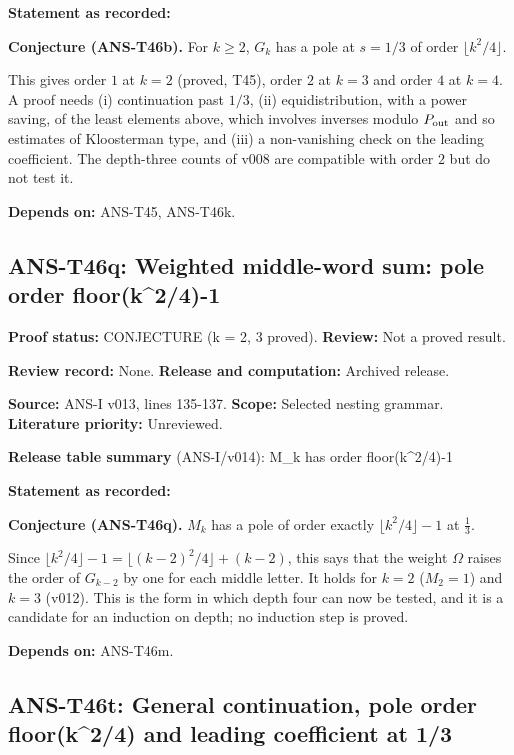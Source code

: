 \documentclass[
  11pt,
]{article}
\begin{document}
\textbf{Statement as recorded:}

\textbf{Conjecture (ANS-T46b).} For \(k\ge2\), \(G_k\) has a pole at
\(s=1/3\) of order \(\lfloor k^2/4\rfloor\).

This gives order \(1\) at \(k=2\) (proved, T45), order \(2\) at \(k=3\)
and order \(4\) at \(k=4\). A proof needs (i) continuation past \(1/3\),
(ii) equidistribution, with a power saving, of the least elements above,
which involves inverses modulo \(P_{\rm out}\) and so estimates of
Kloosterman type, and (iii) a non-vanishing check on the leading
coefficient. The depth-three counts of v008 are compatible with order
\(2\) but do not test it.

\textbf{Depends on:} ANS-T45, ANS-T46k.

\hypertarget{ans-t46q-weighted-middle-word-sum-pole-order-floork24-1}{%
\subsection{ANS-T46q: Weighted middle-word sum: pole order
floor(k\^{}2/4)-1}\label{ans-t46q-weighted-middle-word-sum-pole-order-floork24-1}}

\textbf{Proof status:} CONJECTURE (k = 2, 3 proved). \textbf{Review:}
Not a proved result.

\textbf{Review record:} None. \textbf{Release and computation:} Archived
release.

\textbf{Source:} ANS-I v013, lines 135-137. \textbf{Scope:} Selected
nesting grammar. \textbf{Literature priority:} Unreviewed.

\textbf{Release table summary} (ANS-I/v014): M\_k has order
floor(k\^{}2/4)-1

\textbf{Statement as recorded:}

\textbf{Conjecture (ANS-T46q).} \(M_k\) has a pole of order exactly
\(\lfloor k^2/4\rfloor-1\) at \(\frac13\).

Since \(\lfloor k^2/4\rfloor-1=\lfloor(k-2)^2/4\rfloor+(k-2)\), this
says that the weight \(\Omega\) raises the order of \(G_{k-2}\) by one
for each middle letter. It holds for \(k=2\) (\(M_2=1\)) and \(k=3\)
(v012). This is the form in which depth four can now be tested, and it
is a candidate for an induction on depth; no induction step is proved.

\textbf{Depends on:} ANS-T46m.

\hypertarget{ans-t46t-general-continuation-pole-order-floork24-and-leading-coefficient-at-13}{%
\subsection{ANS-T46t: General continuation, pole order floor(k\^{}2/4)
and leading coefficient at
1/3}\label{ans-t46t-general-continuation-pole-order-floork24-and-leading-coefficient-at-13}}
\end{document}
